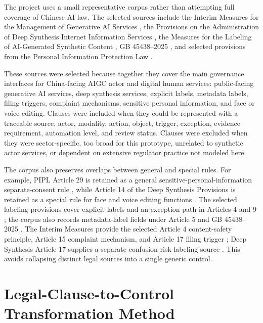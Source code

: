 \documentclass[10pt,journal]{IEEEtran}
\begin{document}
The project uses a small representative corpus rather than attempting full coverage of Chinese AI law. The selected sources include the Interim Measures for the Management of Generative AI Services \cite{genaiMeasures2023}, the Provisions on the Administration of Deep Synthesis Internet Information Services \cite{deepSynthesisProvisions2022}, the Measures for the Labeling of AI-Generated Synthetic Content \cite{aigcLabelingMeasures2025}, GB 45438--2025 \cite{gb45438}, and selected provisions from the Personal Information Protection Law \cite{pipl2021}.

These sources were selected because together they cover the main governance interfaces for China-facing AIGC actor and digital human services: public-facing generative AI services, deep synthesis services, explicit labels, metadata labels, filing triggers, complaint mechanisms, sensitive personal information, and face or voice editing. Clauses were included when they could be represented with a traceable source, actor, modality, action, object, trigger, exception, evidence requirement, automation level, and review status. Clauses were excluded when they were sector-specific, too broad for this prototype, unrelated to synthetic actor services, or dependent on extensive regulator practice not modeled here.

The corpus also preserves overlaps between general and special rules. For example, PIPL Article 29 is retained as a general sensitive-personal-information separate-consent rule \cite{pipl2021}, while Article 14 of the Deep Synthesis Provisions is retained as a special rule for face and voice editing functions \cite{deepSynthesisProvisions2022}. The selected labeling provisions cover explicit labels and an exception path in Articles 4 and 9 \cite{aigcLabelingMeasures2025}; the corpus also records metadata-label fields under Article 5 and GB 45438--2025 \cite{aigcLabelingMeasures2025,gb45438}. The Interim Measures provide the selected Article 4 content-safety principle, Article 15 complaint mechanism, and Article 17 filing trigger \cite{genaiMeasures2023}; Deep Synthesis Article 17 supplies a separate confusion-risk labeling source \cite{deepSynthesisProvisions2022}. This avoids collapsing distinct legal sources into a single generic control.

\section{Legal-Clause-to-Control Transformation Method}
\end{document}
